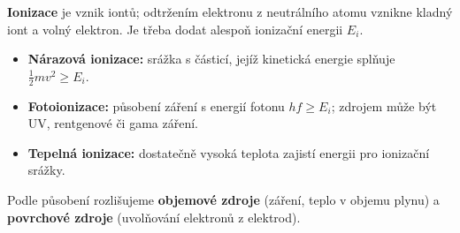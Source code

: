 \textbf{Ionizace} je vznik iontů; odtržením elektronu z neutrálního atomu vznikne kladný iont a volný elektron. Je třeba dodat alespoň ionizační energii $E_i$.
\begin{itemize}
\item \textbf{Nárazová ionizace:} srážka s částicí, jejíž kinetická energie splňuje $\tfrac12mv^2\ge E_i$.
\item \textbf{Fotoionizace:} působení záření s energií fotonu $hf\ge E_i$; zdrojem může být UV, rentgenové či gama záření.
\item \textbf{Tepelná ionizace:} dostatečně vysoká teplota zajistí energii pro ionizační srážky.
\end{itemize}
Podle působení rozlišujeme \textbf{objemové zdroje} (záření, teplo v objemu plynu) a \textbf{povrchové zdroje} (uvolňování elektronů z elektrod).
